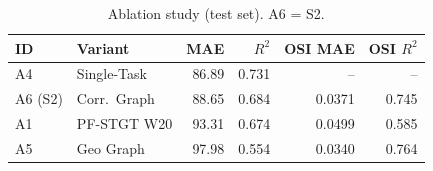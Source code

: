 \begin{table}[!t]
\caption{Ablation study (test set). A6 = S2.}
\label{tab:ablation}
\centering
\scriptsize
\begin{tabular}{|l|l|r|r|r|r|}
\hline
\textbf{ID} & \textbf{Variant} & \textbf{MAE} & \textbf{$R^2$} & \textbf{OSI MAE} & \textbf{OSI $R^2$} \\
\hline
A4 & Single-Task & 86.89 & 0.731 & -- & -- \\
A6 (S2) & Corr.\ Graph & 88.65 & 0.684 & 0.0371 & 0.745 \\
A1 & PF-STGT W20 & 93.31 & 0.674 & 0.0499 & 0.585 \\
A5 & Geo Graph & 97.98 & 0.554 & 0.0340 & 0.764 \\
\hline
\end{tabular}
\end{table}
